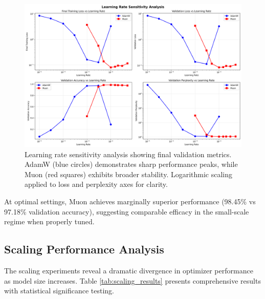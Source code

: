 \documentclass[11pt,a4paper]{article}
\begin{document}
\begin{figure}[H]
    \centering
    \includegraphics[width=\textwidth]{results/experiment_1_learning_rate/lr_sensitivity_analysis.png}
    \caption{Learning rate sensitivity analysis showing final validation metrics. AdamW (blue circles) demonstrates sharp performance peaks, while Muon (red squares) exhibits broader stability. Logarithmic scaling applied to loss and perplexity axes for clarity.}
    \label{fig:lr_sensitivity}
\end{figure}

At optimal settings, Muon achieves marginally superior performance (98.45\% vs 97.18\% validation accuracy), suggesting comparable efficacy in the small-scale regime when properly tuned.

\subsection{Scaling Performance Analysis}

The scaling experiments reveal a dramatic divergence in optimizer performance as model size increases. Table \ref{tab:scaling_results} presents comprehensive results with statistical significance testing.
\end{document}
